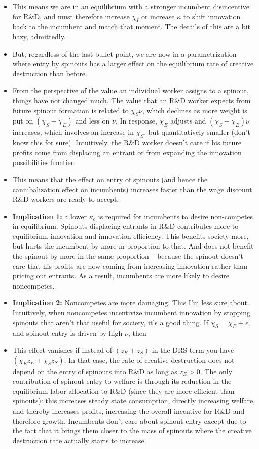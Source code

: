 \documentclass[12pt,english]{article}
\theoremstyle{remark}
\begin{document}
\begin{enumerate}
\begin{itemize}
\begin{itemize}
			\item This means we are in an equilibrium with a stronger incumbent disincentive for R\&D, and must therefore increase $\chi_I$ or increase $\kappa$ to shift innovation back to the incumbent and match that moment. The details of this are a bit hazy, admittedly.
			\item But, regardless of the last bullet point, we are now in a parametrization where entry by spinouts has a larger effect on the equilibrium rate of creative destruction than before.
			\item From the perspective of the value an individual worker assigns to a spinout, things have not changed much. The value that an R\&D worker expects from future spinout formation is related to $\chi_S \nu$, which declines as more weight is put on $(\chi_S -\chi_E)$ and less on $\nu$. In response, $\chi_E$ adjusts and $(\chi_S- \chi_E) \nu$ increases, which involves an increase in $\chi_S$, but quantitatively smaller (don't know this for sure). Intuitively, the R\&D worker doesn't care if his future profits come from displacing an entrant or from expanding the innovation possibilities frontier.
			\item This means that the effect on entry of spinouts (and hence the cannibalization effect on incumbents) increases faster than the wage discount R\&D workers are ready to accept.
			\item \textbf{Implication 1:} a lower $\kappa_e$ is required for incumbents to desire non-competes in equilibrium. Spinouts displacing entrants in R\&D contributes more to equilibrium innovation and innovation efficiency. This benefits society more, but hurts the incumbent by more in proportion to that. And does not benefit the spinout by more in the same proportion -- because the spinout doesn't care that his profits are now coming from increasing innovation rather than pricing out entrants. As a result, incumbents are more likely to desire noncompetes.
			\item \textbf{Implication 2:} Noncompetes are more damaging. This I'm less sure about. Intuitively, when noncompetes incentivize incumbent innovation by stopping spinouts that aren't that useful for society, it's a good thing. If $\chi_S = \chi_E + \epsilon$, and spinout entry is driven by high $\nu$, then 
			\item This effect vanishes if instead of $(z_E + z_S)$ in the DRS term you have $(\chi_E z_E + \chi_S z_S)$. In that case, the rate of creative destruction does not depend on the entry of spinouts into R\&D as long as $z_E > 0$. The only contribution of spinout entry to welfare is through its reduction in the equilibrium labor allocation to R\&D (since they are more efficient than spinouts): this increases steady state consumption, directly increasing welfare, and thereby increases profits, increasing the overall incentive for R\&D and therefore growth. Incumbents don't care about spinout entry except due to the fact that it brings them closer to the mass of spinouts where the creative destruction rate actually starts to increase.

\end{itemize}
\end{itemize}
\end{enumerate}
\end{document}
